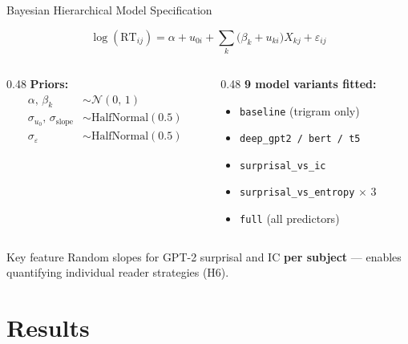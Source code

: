 \documentclass[aspectratio=169]{beamer}
\begin{document}
\begin{frame}{Bayesian Hierarchical Model Specification}

  \[
    \log(\text{RT}_{ij}) = \alpha + u_{0i}
      + \sum_k \bigl(\beta_k + u_{ki}\bigr) X_{kj} + \varepsilon_{ij}
  \]

  \vspace{0.5em}
  \begin{columns}[T]
    \begin{column}{0.48\textwidth}
      \textbf{Priors:}
      \begin{align*}
        \alpha,\,\beta_k &\sim \mathcal{N}(0,\,1) \\
        \sigma_{u_0},\,\sigma_{\text{slope}} &\sim \text{HalfNormal}(0.5) \\
        \sigma_\varepsilon &\sim \text{HalfNormal}(0.5)
      \end{align*}
    \end{column}
    \begin{column}{0.48\textwidth}
      \textbf{9 model variants fitted:}
      \begin{itemize}\small
        \item \texttt{baseline} (trigram only)
        \item \texttt{deep\_gpt2 / bert / t5}
        \item \texttt{surprisal\_vs\_ic}
        \item \texttt{surprisal\_vs\_entropy} $\times$ 3
        \item \texttt{full} (all predictors)
      \end{itemize}
    \end{column}
  \end{columns}

  \vspace{0.5em}
  \begin{block}{Key feature}
    Random slopes for GPT-2 surprisal and IC \textbf{per subject} — enables
    quantifying individual reader strategies (H6).
  \end{block}
\end{frame}

\section{Results}
\end{document}
